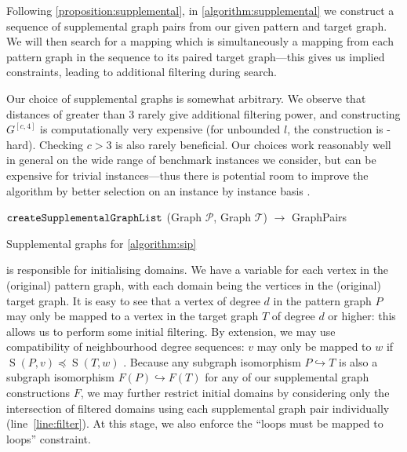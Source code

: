 \documentclass{llncs}
\newcommand{\lineref}[1]{line~\ref{#1}}
\begin{document}
Following \cref{proposition:supplemental}, in \cref{algorithm:supplemental} we construct a sequence
of supplemental graph pairs from our given pattern and target graph. We will then search for a
mapping which is simultaneously a mapping from each pattern graph in the sequence to its paired
target graph---this gives us implied constraints, leading to additional filtering during search.

Our choice of supplemental graphs is somewhat arbitrary. We observe that distances of greater than 3
rarely give additional filtering power, and constructing $G^{\left[c, 4\right]}$ is computationally
very expensive (for unbounded $l$, the construction is \NP-hard). Checking $c > 3$ is also rarely
beneficial. Our choices work reasonably well in general on the wide range of benchmark instances we
consider, but can be expensive for trivial instances---thus there is potential room to improve the
algorithm by better selection on an instance by instance basis \cite{Malitsky:2014}.

\begin{algorithm}[h]
\DontPrintSemicolon
\nl $\FuncSty{createSupplementalGraphList}$ (Graph $\mathcal{P}$, Graph $\mathcal{T}$) $\rightarrow$ GraphPairs \;
\nl {}
\caption{Supplemental graphs for \cref{algorithm:sip}}
\label{algorithm:supplemental}
\end{algorithm}

 is responsible for initialising domains. We have a variable for each vertex in
the (original) pattern graph, with each domain being the vertices in the (original) target graph. It
is easy to see that a vertex of degree $d$ in the pattern graph $P$ may only be mapped to a vertex in
the target graph $T$ of degree $d$ or higher: this allows us to perform some initial filtering. By
extension, we may use compatibility of neighbourhood degree sequences: $v$ may only be mapped to $w$
if $\operatorname{S}(P, v) \preceq \operatorname{S}(T, w)$ \cite{Zampelli:2010}.  Because any
subgraph isomorphism $P \hookrightarrow T$ is also a subgraph isomorphism $F(P) \hookrightarrow
F(T)$ for any of our supplemental graph constructions $F$, we may further restrict initial domains
by considering only the intersection of filtered domains using each supplemental graph pair
individually (\lineref{line:filter}). At this stage, we also enforce the ``loops must be mapped to loops'' constraint.
\end{document}
